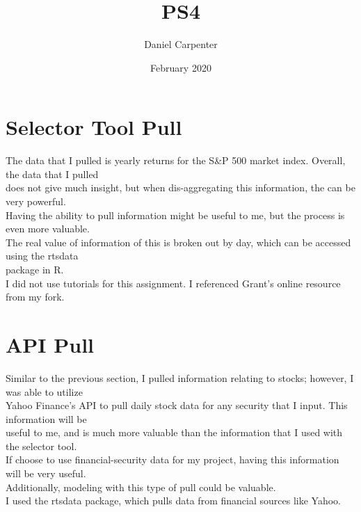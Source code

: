 \documentclass{article}
\title{PS4}
\author{Daniel Carpenter}
\date{February 2020}
\begin{document}
\maketitle

\section{Selector Tool Pull}
The data that I pulled is yearly returns for the S&P 500 market index. Overall, the data that I pulled  \\
does not give much insight, but when dis-aggregating this information, the can be very powerful. \\
Having the ability to pull information might be useful to me, but the process is even more valuable. \\
The real value of information of this is broken out by day, which can be accessed using the rtsdata \\
package in R. \\

I did not use tutorials for this assignment. I referenced Grant's online resource from my fork.

\section{API Pull}
Similar to the previous section, I pulled information relating to stocks; however, I was able to utilize \\
Yahoo Finance's API to pull daily stock data for any security that I input. This information will be \\
useful to me, and is much more valuable than the information that I used with the selector tool. \\
If choose to use financial-security data for my project, having this information will be very useful. \\
Additionally, modeling with this type of pull could be valuable. \\

I used the rtsdata package, which pulls data from financial sources like Yahoo.
\end{document}
